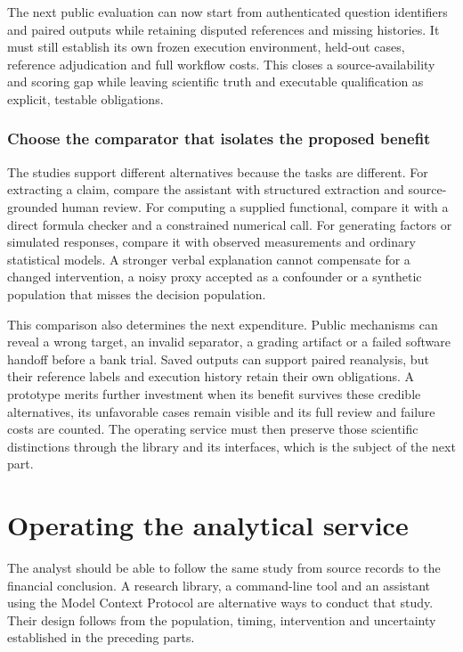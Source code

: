 The next public evaluation can now start from authenticated question identifiers
and paired outputs while retaining disputed references and missing histories.
It must still establish its own frozen execution environment, held-out cases,
reference adjudication and full workflow costs. This closes a source-availability
and scoring gap while leaving scientific truth and executable qualification as
explicit, testable obligations.

\section{Choose the comparator that isolates the proposed benefit}

The studies support different alternatives because the tasks are different. For extracting a claim, compare the assistant with structured extraction and source-grounded human review. For computing a supplied functional, compare it with a direct formula checker and a constrained numerical call. For generating factors or simulated responses, compare it with observed measurements and ordinary statistical models. A stronger verbal explanation cannot compensate for a changed intervention, a noisy proxy accepted as a confounder or a synthetic population that misses the decision population.

This comparison also determines the next expenditure. Public mechanisms can reveal a wrong target, an invalid separator, a grading artifact or a failed software handoff before a bank trial. Saved outputs can support paired reanalysis, but their reference labels and execution history retain their own obligations. A prototype merits further investment when its benefit survives these credible alternatives, its unfavorable cases remain visible and its full review and failure costs are counted. The operating service must then preserve those scientific distinctions through the library and its interfaces, which is the subject of the next part.



\part{Operating the analytical service}
\label{reading:part-practice}
The analyst should be able to follow the same study from source records
to the financial conclusion. A research library, a command-line tool and an
assistant using the Model Context Protocol are alternative ways to conduct that
study. Their design follows from the population, timing, intervention and
uncertainty established in the preceding parts.


